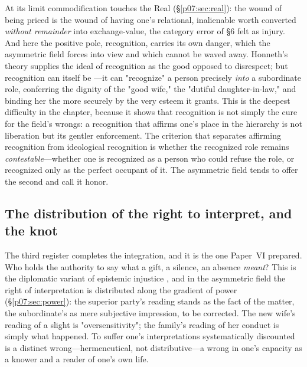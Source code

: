 \documentclass[11pt,a4paper]{article}
\newcommand{\emb}[1]{\textcolor{rose}{\oldtextbf{#1}}}
\newcommand{\xref}[1]{\textcolor{rose}{\S\ref{#1}}}
\newcommand{\pinkref}[1]{\textcolor{rose}{#1}}
\begin{document}
At its limit commodification touches the Real (\xref{p07:sec:real}): the wound of being priced is the wound of having one's relational, inalienable worth converted \emph{without remainder} into exchange-value, the category error of \pinkref{§6} felt as injury. And here the positive pole, recognition, carries its own danger, which the asymmetric field forces into view and which cannot be waved away. Honneth's theory \parencite{honneth1992} supplies the ideal of recognition as the good opposed to disrespect; but recognition can itself be \emb{ideological}---it can "recognize" a person precisely \emph{into} a subordinate role, conferring the dignity of the "good wife," the "dutiful daughter-in-law," and binding her the more securely by the very esteem it grants. This is the deepest difficulty in the chapter, because it shows that recognition is not simply the cure for the field's wrongs: a recognition that affirms one's place in the hierarchy is not liberation but its gentler enforcement. The criterion that separates affirming recognition from ideological recognition is whether the recognized role remains \emph{contestable}---whether one is recognized as a person who could refuse the role, or recognized only as the perfect occupant of it. The asymmetric field tends to offer the second and call it honor.

\subsection{The distribution of the right to interpret, and the knot}
The third register completes the integration, and it is the one \pinkref{Paper~VI} prepared. Who holds the authority to say what a gift, a silence, an absence \emph{meant}? This is the diplomatic variant of epistemic injustice \parencite{fricker2007}, and in the asymmetric field the right of interpretation is distributed along the gradient of power (\xref{p07:sec:power}): the superior party's reading stands as the fact of the matter, the subordinate's as mere subjective impression, to be corrected. The new wife's reading of a slight is "oversensitivity"; the family's reading of her conduct is simply what happened. To suffer one's interpretations systematically discounted is a distinct wrong---hermeneutical, not distributive---a wrong in one's capacity as a knower and a reader of one's own life.
\end{document}
